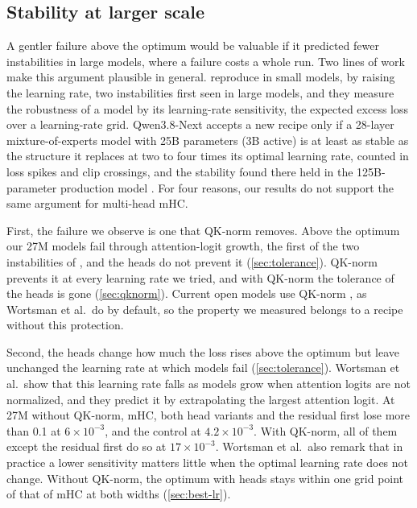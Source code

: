 \documentclass[11pt, a4paper]{article}
\newcommand{\lr}[1]{\ensuremath{#1 \times 10^{-3}}}
\begin{document}
\subsection{Stability at larger scale}
\label{sec:scale}

A gentler failure above the optimum would be valuable if it predicted fewer instabilities in large models, where a failure costs a
whole run. Two lines of work make this argument plausible in general.  reproduce in small models, by
raising the learning rate, two instabilities first seen in large models, and they measure the robustness of a model by its
learning-rate sensitivity, the expected excess loss over a learning-rate grid. Qwen3.8-Next accepts a new recipe only if a
28-layer mixture-of-experts model with 25B parameters (3B active) is at least as stable as the structure it replaces at two to
four times its optimal learning rate, counted in loss spikes and clip crossings, and the stability found there held in the
125B-parameter production model \citep{qiu2026qwen38next}. For four reasons, our results do not support the same argument for
multi-head mHC.

First, the failure we observe is one that QK-norm removes. Above the optimum our 27M models fail through attention-logit growth, the
first of the two instabilities of \citet{wortsman2023proxies}, and the heads do not prevent it (\cref{sec:tolerance}). QK-norm
prevents it at every learning rate we tried, and with QK-norm the tolerance of the heads is gone (\cref{sec:qknorm}). Current open
models use QK-norm \citep{olmo2024olmo2, gemma2025gemma3, yang2025qwen3}, as Wortsman et al.\ do by default, so the property we
measured belongs to a recipe without this protection.

Second, the heads change how much the loss rises above the optimum but leave unchanged the learning rate at which models
fail (\cref{sec:tolerance}). Wortsman et al.\ show that this learning rate falls as models grow when attention logits are not normalized,
and they predict it by extrapolating the largest attention logit. At 27M without QK-norm, mHC, both head
variants and the residual first lose more than 0.1 at \lr{6}, and the control at \lr{4.2}. With QK-norm, all of them except the
residual first do so at \lr{17}. Wortsman et al.\ also remark that in practice a lower
sensitivity matters little when the optimal learning rate does not change. Without QK-norm, the
optimum with heads stays within one grid point of that of mHC at both widths (\cref{sec:best-lr}).
\end{document}
